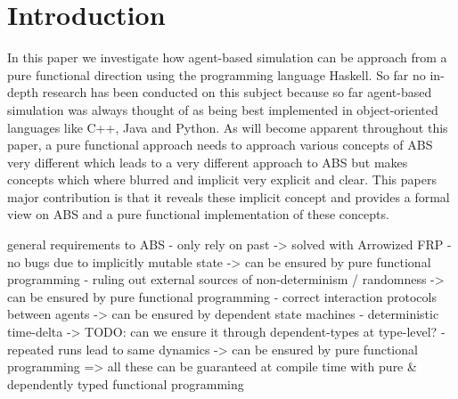 \section{Introduction}
In this paper we investigate how agent-based simulation can be approach from a pure functional direction using the programming language Haskell. So far no in-depth research has been conducted on this subject because so far agent-based simulation was always thought of as being best implemented in object-oriented languages like C++, Java and Python. 
As will become apparent throughout this paper, a pure functional approach needs to approach various concepts of ABS very different which leads to a very different approach to ABS but makes concepts which where blurred and implicit very explicit and clear.
This papers major contribution is that it reveals these implicit concept and provides a formal view on ABS and a pure functional implementation of these concepts.

general requirements to ABS 
- only rely on past
	-> solved with Arrowized FRP
- no bugs due to implicitly mutable state
	-> can be ensured by pure functional programming
- ruling out external sources of non-determinism / randomness
	-> can be ensured by pure functional programming
- correct interaction protocols between agents
	-> can be ensured by dependent state machines
- deterministic time-delta
	-> TODO: can we ensure it through dependent-types at type-level?
- repeated runs lead to same dynamics 
	-> can be ensured by pure functional programming
=> all these can be guaranteed at compile time with pure \& dependently typed functional programming 